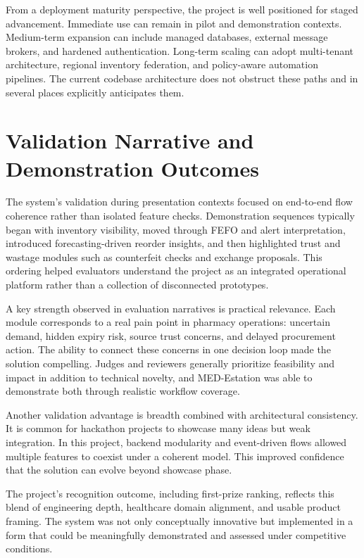 \documentclass[12pt,a4paper]{report}
\begin{document}
From a deployment maturity perspective, the project is well positioned for staged advancement. Immediate use can remain in pilot and demonstration contexts. Medium-term expansion can include managed databases, external message brokers, and hardened authentication. Long-term scaling can adopt multi-tenant architecture, regional inventory federation, and policy-aware automation pipelines. The current codebase architecture does not obstruct these paths and in several places explicitly anticipates them.

\chapter{Validation Narrative and Demonstration Outcomes}
The system’s validation during presentation contexts focused on end-to-end flow coherence rather than isolated feature checks. Demonstration sequences typically began with inventory visibility, moved through FEFO and alert interpretation, introduced forecasting-driven reorder insights, and then highlighted trust and wastage modules such as counterfeit checks and exchange proposals. This ordering helped evaluators understand the project as an integrated operational platform rather than a collection of disconnected prototypes.

A key strength observed in evaluation narratives is practical relevance. Each module corresponds to a real pain point in pharmacy operations: uncertain demand, hidden expiry risk, source trust concerns, and delayed procurement action. The ability to connect these concerns in one decision loop made the solution compelling. Judges and reviewers generally prioritize feasibility and impact in addition to technical novelty, and MED-Estation was able to demonstrate both through realistic workflow coverage.

Another validation advantage is breadth combined with architectural consistency. It is common for hackathon projects to showcase many ideas but weak integration. In this project, backend modularity and event-driven flows allowed multiple features to coexist under a coherent model. This improved confidence that the solution can evolve beyond showcase phase.

The project’s recognition outcome, including first-prize ranking, reflects this blend of engineering depth, healthcare domain alignment, and usable product framing. The system was not only conceptually innovative but implemented in a form that could be meaningfully demonstrated and assessed under competitive conditions.
\end{document}
